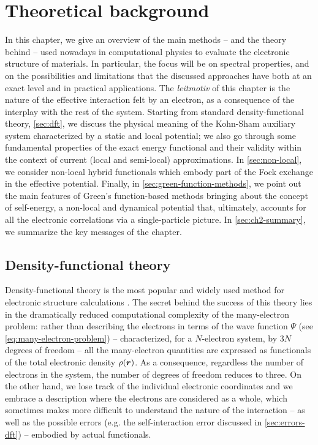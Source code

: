 \cleardoublepage
\chapter{Theoretical background\label{ch:theoretical-background}}

In this chapter, we give an overview of the main methods -- and the theory behind -- used nowadays in computational physics to evaluate the electronic structure of materials. In particular, the focus will be on spectral properties, and on the possibilities and limitations that the discussed approaches have both at an exact level and in practical applications. The \emph{leitmotiv} of this chapter is the nature of the effective interaction felt by an electron, as a consequence of the interplay with the rest of the system. Starting from standard density-functional theory, \cref{sec:dft}, we discuss the physical meaning of the Kohn-Sham auxiliary system characterized by a static and local potential; we also go through some fundamental properties of the exact energy functional and their validity within the context of current (local and semi-local) approximations. In \cref{sec:non-local}, we consider non-local hybrid functionals which embody part of the Fock exchange in the effective potential. Finally, in \cref{sec:green-function-methods}, we point out the main features of Green's function-based methods bringing about the concept of self-energy, a non-local and dynamical potential that, ultimately, accounts for all the electronic correlations via a single-particle picture. In \cref{sec:ch2-summary}, we summarize the key messages of the chapter.

\clearpage
\section{Density-functional theory\label{sec:dft}}
Density-functional theory is the most popular and widely used method for electronic structure calculations \cite{van_noorden_top_2014}. The secret behind the success of this theory lies in the dramatically reduced computational complexity of the many-electron problem: rather than describing the electrons in terms of the wave function $\Psi$ (see \cref{eq:many-electron-problem}) -- characterized, for a $N$-electron system, by $3N$ degrees of freedom -- all the many-electron quantities are expressed as functionals of the total electronic density $\rho({\bm r})$. As a consequence, regardless the number of electrons in the system, the number of degrees of freedom reduces to three. On the other hand, we lose track of the individual electronic coordinates and we embrace a description where the electrons are considered as a whole, which sometimes makes more difficult to understand the nature of the interaction -- as well as the possible errors (e.g. the self-interaction error discussed in \cref{sec:errors-dft}) -- embodied by actual functionals.

